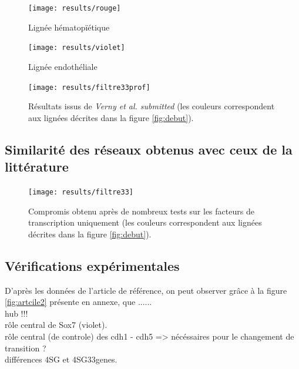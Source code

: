 \documentclass[fleqn,11pt]{SelfArx} %
\begin{document}
\begin{figure}[ht]
\centering
\texttt{[image: results/rouge]}
\caption{Lignée hématopïétique}
\label{fig:4SG}
\end{figure}


\begin{figure}[ht]
\centering
\texttt{[image: results/violet]}
\caption{Lignée endothéliale}
\label{fig:4SFG}
\end{figure}

\begin{figure}[ht]
\centering
\texttt{[image: results/filtre33prof]}
\caption{Résultats issus de \textit{Verny et al. submitted} (les couleurs correspondent aux lignées décrites dans la figure \ref{fig:debut}).}
\label{fig:filtre33prof}
\end{figure}

\subsection{Similarité des réseaux obtenus avec ceux de la littérature}
\begin{figure}[ht]
\centering
\texttt{[image: results/filtre33]}
\caption{Compromis obtenu après de nombreux tests sur les facteurs de transcription uniquement (les couleurs correspondent aux lignées décrites dans la figure \ref{fig:debut}).}
\label{fig:filtre33}
\end{figure}


\subsection{Vérifications expérimentales}
D'après les données de l'article de référence\cite{Moignard}, on peut observer grâce à la figure \ref{fig:artcile2} présente en annexe, que ...... \\
hub !!! \\ 
rôle central de Sox7 (violet). \\
rôle central (de controle) des cdh1 - cdh5 => nécéssaires pour le changement de transition ? \\
différences 4SG et 4SG33genes. \\



\end{document}
